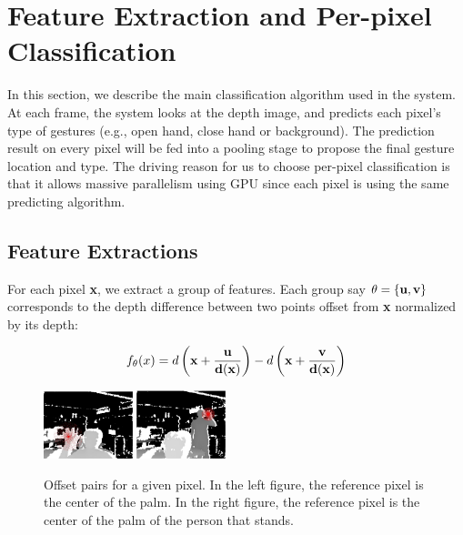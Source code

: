 \section{Feature Extraction and Per-pixel Classification}
\label{sec: Classification}

In this section, we describe the main classification algorithm used in the system. At each frame, the system looks at the depth image, and predicts each pixel's type of gestures (e.g., open hand, close hand or background). The prediction result on every pixel will be fed into a pooling stage to propose the final gesture location and type. The driving reason for us to choose per-pixel classification is that it allows massive parallelism using GPU since each pixel is using the same predicting algorithm.  

\subsection{Feature Extractions}
\label{sec: feacture_extraction}
For each pixel \textbf{x}, we extract a group of features. Each group say $\theta=\{\bf{u}, \bf{v} \}$ corresponds to the depth difference between two points offset from \textbf{x} normalized by its depth:

\begin{equation} 
\label{eqn:feature}
f_{\theta}(x) = d\left(\bf{x} + \frac{\bf{u}}{d(\bf{x})}\right) - d\left(\bf{x} + \frac{\bf{v}}{d(\bf{x})}\right)
\end{equation}

\begin{figure}
	\includegraphics[width=0.23\textwidth]{fig/OpenHandNearOffset.jpg}
	\includegraphics[width=0.23\textwidth]{fig/OpenHandFarOffset.jpg}
	
	\caption{Offset pairs for a given pixel. In the left figure, the reference pixel is the center of the palm. In the right figure, the reference pixel is the center of the palm of the person that stands. }
	\label{fig:offset}
\end{figure}

